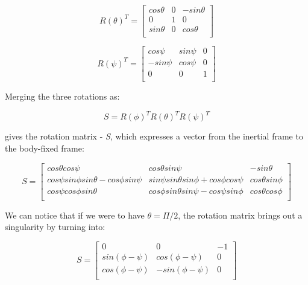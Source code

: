  \begin{equation}
\label{pitchrotation}	
 	R(\theta)^{T}=\begin{bmatrix}
 	cos\theta & 0 & -sin\theta \\
 	0 & 1 & 0 \\
 	sin\theta & 0 & cos\theta \\
 	\end{bmatrix}
 \end{equation}
 
 \begin{equation}
\label{yawrotation}	
 	R(\psi)^{T}=\begin{bmatrix}
 	cos\psi & sin\psi & 0 \\
 	-sin\psi & cos\psi & 0 \\
 	0 & 0 & 1 \\
 	\end{bmatrix}
 \end{equation}
 
Merging the three rotations as: 

 \begin{equation}
\label{S1}	
 	S=R(\phi)^{T}R(\theta)^{T}R(\psi)^{T}
 \end{equation}
 
gives the rotation matrix - \textit{S}, which expresses a vector from the inertial frame to the body-fixed frame: 
 
  \begin{equation}
\label{S2}
 S=\begin{bmatrix}
 	cos\theta cos\psi & cos\theta sin\psi & -sin\theta \\
 	cos\psi sin\phi sin\theta-cos\phi sin\psi & sin\psi sin\theta sin\phi+cos\phi cos\psi & cos\theta sin\phi \\
 	cos\psi cos\phi sin\theta & cos\phi sin\theta sin\psi-cos\psi sin\phi & cos\theta cos\phi \\
 	\end{bmatrix}
 	 \end{equation}
 	 
We can notice that if we were to have $\theta=\Pi/2$, the rotation matrix brings out a singularity by turning into:

  \begin{equation}
\label{S3}
 S=\begin{bmatrix}
 	0 & 0 & -1 \\
 	sin(\phi-\psi) & cos(\phi-\psi) & 0 \\
 	cos(\phi-\psi) & -sin(\phi-\psi) & 0 \\
 	\end{bmatrix}
 	 \end{equation}
 	 
